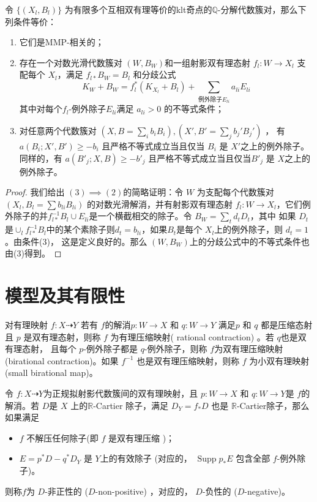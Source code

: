 \begin{lemma}\label{MMPrelatedConditation}
  \cite[Proposition 3.4]{brunoLogSarkisovProgram1995}
  令 $ \{(X_l,B_l)\} $ 为有限多个互相双有理等价的klt奇点的$ \mathbb{Q} $-分解代数簇对，那么下列条件等价：
  \begin{enumerate}
    \item 它们是MMP-相关的；
    \item 存在一个对数光滑代数簇对 $ (W,B_W) $和一组射影双有理态射  $ f_l:W\to  X_l $ 支配每个 $ X_l $，满足 $ f_{l*}B_W=B_l $ 和分歧公式
      \[ K_W+B_W=f_l^*(K_{X_l}+B_l)+\sum_{\text{例外除子}E_{li}}{a_{li}E_{li}} \]
          其中对每个$ f_l $-例外除子$E_{li}$满足 $a_{li}>0$ 的不等式条件；
    \item 对任意两个代数簇对 $ (X,B=\sum_ib_{i }B_i),(X',B'=\sum_{j}b_{j}'B_{j}') $ ， 有  $ a(B_i;X',B')\geqslant -b_i $ 且严格不等式成立当且仅当 $ B_i $ 是 $ X' $之上的例外除子。同样的，有 $ a(B'_j;X,B)\geqslant -b'_j $ 且严格不等式成立当且仅当$ B'_j $ 是 $ X $之上的例外除子。
  \end{enumerate}
\end{lemma}
\begin{proof}
  我们给出  $(3) \implies (2)$的简略证明：令 $W$ 为支配每个代数簇对 $(X_l,B_l=\sum b_{li}B_{li})$ 的对数光滑解消，并有射影双有理态射 $f_l:W\to X_l$，它们例外除子的并$f_{l*}^{-1}B_l\cup E_{li}$是一个横截相交的除子。令 $B_W=\sum_t d_tD_t $，其中  如果 $D_t$ 是$\cup_l f_{l*}^{-1}B_l$中的某个素除子则$d_t = b_{li}$，如果$B_{t}$是每个 $X_{l}$上的例外除子，则  $d_t=1$。由条件(3)， 这是定义良好的。那么 $(W,B_{W})$上的分歧公式中的不等式条件也由(3)得到。 \end{proof}

\section{模型及其有限性}

\begin{definition}
  \cite[\S 2]{haconSarkisovProgram2012} 对有理映射 $f:X\dashrightarrow Y$  若有 $f$的解消$p:W\to X$ 和 $q:W\to Y$ 满足$p$  和 $q$ 都是压缩态射且 $p$ 是双有理态射，则称 $f$ 为有理压缩映射( rational contraction)  。若 $ q$也是双有理态射， 且每个 $p$-例外除子都是 $q$-例外除子，则称 $f$为双有理压缩映射 (birational contraction)。如果 $f^{-1}$ 也是双有理压缩映射，则称 $f$ 为小双有理映射 (small birational map)。
\end{definition}

\begin{definition}\label{negativemap}
  \cite[Definition 3.6.1]{BCHM10}令 $f:X\dashrightarrow Y$为正规拟射影代数簇间的双有理映射，且 $p:W\to X$ 和 $q:W\to Y$是 $f$的解消。若 $D$是 $X$ 上的$\mathbb{R}$-Cartier 除子，满足  $D_{Y}=f_*D$ 也是 $\mathbb{R}$-Cartier除子，那么如果满足
  \begin{itemize}
    \item $f$ 不解压任何除子(即 $f$ 是双有理压缩 )；
    \item $E=p^{*}D-q^*D_Y$ 是  $Y$上的有效除子 (对应的， $\operatorname{Supp}p_*E$ 包含全部 $f$-例外除子)。
  \end{itemize}
 则称$f$为 $D$-非正性的  ($D$-non-positive) ，对应的， $D$-负性的 ($D$-negative)。
\end{definition}

